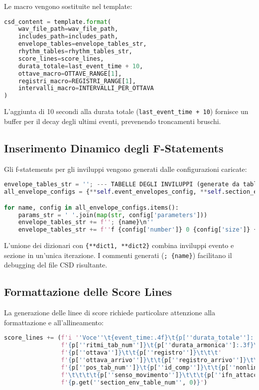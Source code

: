 Le macro vengono sostituite nel template:

\begin{lstlisting}[language=Python]
csd_content = template.format(
    wav_file_path=wav_file_path,
    includes_path=includes_path,
    envelope_tables=envelope_tables_str,
    rhythm_tables=rhythm_tables_str,
    score_lines=score_lines,
    durata_totale=last_event_time + 10,
    ottave_macro=OTTAVE_RANGE[1],
    registri_macro=REGISTRI_RANGE[1],
    intervalli_macro=INTERVALLI_PER_OTTAVA
)
\end{lstlisting}

L'aggiunta di 10 secondi alla durata totale (\texttt{last\_event\_time + 10}) fornisce un buffer per il decay degli ultimi eventi, prevenendo troncamenti bruschi.
\subsection{Inserimento Dinamico degli F-Statements}
Gli f-statements per gli inviluppi vengono generati dalle configurazioni caricate:

\begin{lstlisting}[language=Python]
envelope_tables_str = ''; --- TABELLE DEGLI INVILUPPI (generate da tables.yaml) ---\n''
all_envelope_configs = {**self.event_envelopes_config, **self.section_envelopes_config}

for name, config in all_envelope_configs.items():
    params_str = ' '.join(map(str, config['parameters']))
    envelope_tables_str += f''; {name}\n''
    envelope_tables_str += f''f {config['number']} 0 {config['size']} {config['gen_routine']} {params_str}\n''
\end{lstlisting}

L'unione dei dizionari con \texttt{\{**dict1, **dict2\}} combina inviluppi evento e sezione in un'unica iterazione. I commenti generati (\texttt{; \{name\}}) facilitano il debugging del file CSD risultante.
\subsection{Formattazione delle Score Lines}
La generazione delle linee di score richiede particolare attenzione alla formattazione e all'allineamento:

\begin{lstlisting}[language=Python]
score_lines += (f'i ''Voce''\t{event_time:.4f}\t{p[''durata_totale'']:.3f}\t'
                f'{p[''ritmi_tab_num'']}\t{p[''durata_armonica'']:.3f}\t\t{p[''dynamic_index'']:.6f}\t'
                f'{p[''ottava'']}\t\t{p[''registro'']}\t\t\t'
                f'{p[''ottava_arrivo'']}\t\t{p[''registro_arrivo'']}\t\t'
                f'{p[''pos_tab_num'']}\t{p[''id_comp'']}\t\t{p[''nonlinear_mode'']}'
                f'\t\t\t\t{p[''senso_movimento'']}\t\t\t{p[''ifn_attacco'']}\t\t\t'
                f'{p.get(''section_env_table_num'', 0)}')
\end{lstlisting}

